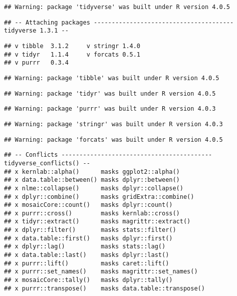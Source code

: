 \documentclass[
]{article}
\begin{document}
\begin{verbatim}
## Warning: package 'tidyverse' was built under R version 4.0.5
\end{verbatim}

\begin{verbatim}
## -- Attaching packages --------------------------------------- tidyverse 1.3.1 --
\end{verbatim}

\begin{verbatim}
## v tibble  3.1.2     v stringr 1.4.0
## v tidyr   1.1.4     v forcats 0.5.1
## v purrr   0.3.4
\end{verbatim}

\begin{verbatim}
## Warning: package 'tibble' was built under R version 4.0.5
\end{verbatim}

\begin{verbatim}
## Warning: package 'tidyr' was built under R version 4.0.5
\end{verbatim}

\begin{verbatim}
## Warning: package 'purrr' was built under R version 4.0.3
\end{verbatim}

\begin{verbatim}
## Warning: package 'stringr' was built under R version 4.0.3
\end{verbatim}

\begin{verbatim}
## Warning: package 'forcats' was built under R version 4.0.5
\end{verbatim}

\begin{verbatim}
## -- Conflicts ------------------------------------------ tidyverse_conflicts() --
## x kernlab::alpha()      masks ggplot2::alpha()
## x data.table::between() masks dplyr::between()
## x nlme::collapse()      masks dplyr::collapse()
## x dplyr::combine()      masks gridExtra::combine()
## x mosaicCore::count()   masks dplyr::count()
## x purrr::cross()        masks kernlab::cross()
## x tidyr::extract()      masks magrittr::extract()
## x dplyr::filter()       masks stats::filter()
## x data.table::first()   masks dplyr::first()
## x dplyr::lag()          masks stats::lag()
## x data.table::last()    masks dplyr::last()
## x purrr::lift()         masks caret::lift()
## x purrr::set_names()    masks magrittr::set_names()
## x mosaicCore::tally()   masks dplyr::tally()
## x purrr::transpose()    masks data.table::transpose()
\end{verbatim}
\end{document}
